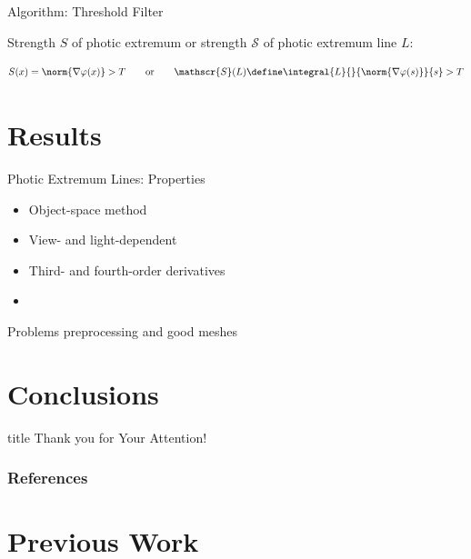 \documentclass[aspectratio=169]{beamer}
\begin{document}
\begin{frame}{Algorithm: Threshold Filter}
\begin{figure}
    \end{figure}
    \pause
    Strength $S$ of photic extremum or strength $\mathscr{S}$ of photic extremum line $L$:
    \begin{mybox}
      \[
        S(x) = \norm{\nabla \varphi(x)} > T
        \qquad \text{or} \qquad
        \mathscr{S}(L) \define \integral{L}{}{\norm{\nabla \varphi(s)}}{s} > T
      \]
    \end{mybox}
  \end{frame}

\section{Results}
  \begin{frame}{Photic Extremum Lines: Properties}
    \begin{itemize}
      \item Object-space method
      \item View- and light-dependent
      \item Third- and fourth-order derivatives
      \item
    \end{itemize}
  \end{frame}
  \begin{frame}{Problems}
    preprocessing and good meshes
  \end{frame}

\section{Conclusions}


\begin{frame}
  \vfill
  \centering
  \begin{beamercolorbox}[sep=8pt,center,shadow=true,rounded=true]{title}
    Thank you for Your Attention!%
    \par%
  \end{beamercolorbox}
  \vfill
\end{frame}

\begin{frame}
  \frametitle{References}
  \AtNextBibliography{\tiny}
  \begin{multicols}{2}
    \nocite{*}
    \printbibliography
  \end{multicols}
\end{frame}

\appendix
\section{Previous Work}
\end{document}
